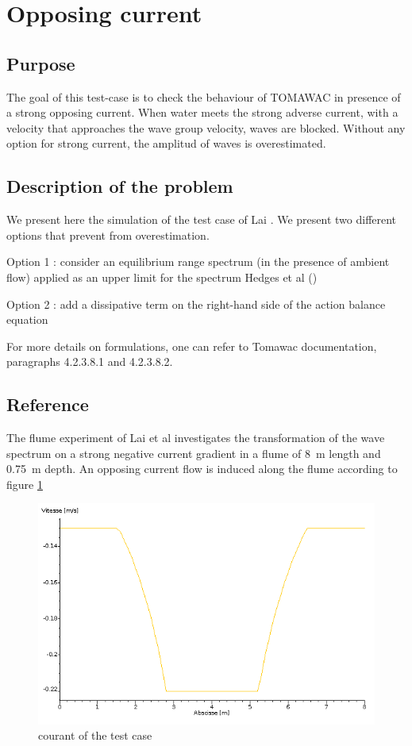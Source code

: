 \section{Opposing current}
%

%
\subsection{Purpose}
%
The goal of this test-case is to check the behaviour of TOMAWAC in presence of a strong opposing current. When water meets the strong adverse current, with a velocity that approaches the wave group velocity, waves are blocked. Without any option for strong current, the amplitud of waves is overestimated.

%
\subsection{Description of the problem}
%
We present here the simulation of the test case of Lai \cite{Lai1989}. We present two different options that prevent from overestimation.

Option 1 : consider an equilibrium range spectrum (in the presence of ambient flow) applied as an upper limit for the spectrum Hedges et al  (\cite{Hedges1985})

Option 2 : add a dissipative term on the right-hand side of the action balance equation \cite{Westhuys2012}

For more details on formulations, one can refer to Tomawac documentation, paragraphs 4.2.3.8.1 and 4.2.3.8.2.

%
\subsection{Reference}
%
The flume experiment of Lai et al \cite{Lai1989} investigates the transformation of the wave spectrum on a strong negative current gradient in a flume of 8~m length and 0.75~m depth. An opposing current flow is induced along the flume according to figure \ref{courant}
\begin{figure} [!h]
\centering
\includegraphics[scale = 0.5]{courant.png}
 \caption{courant of the test case }
\label{courant}
\end{figure}


